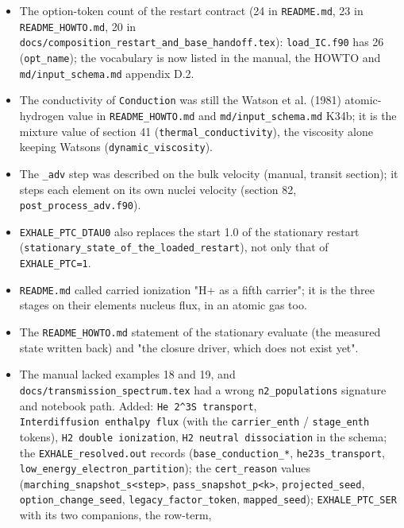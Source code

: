 \documentclass[english,a4paper]{my_memo}
\providecommand{\tightlist}{\setlength{\itemsep}{0pt}\setlength{\parskip}{0pt}}
\begin{document}
\begin{itemize}
\tightlist
\item
  The option-token count of the restart contract (24 in \texttt{README.md}, 23 in
  \texttt{README\_HOWTO.md}, 20 in \texttt{docs/composition\_restart\_and\_base\_handoff.tex}):
  \texttt{load\_IC.f90} has 26 (\texttt{opt\_name}); the vocabulary is now listed in the
  manual, the HOWTO and \texttt{md/input\_schema.md} appendix D.2.
\item
  The conductivity of \texttt{Conduction} was still the Watson et al. (1981)
  atomic-hydrogen value in \texttt{README\_HOWTO.md} and \texttt{md/input\_schema.md} K34b;
  it is the mixture value of section 41 (\texttt{thermal\_conductivity}), the
  viscosity alone keeping Watson\textquotesingle s (\texttt{dynamic\_viscosity}).
\item
  The \texttt{\_adv} step was described on the bulk velocity (manual, transit
  section); it steps each element on its own nuclei velocity (section 82,
  \texttt{post\_process\_adv.f90}).
\item
  \texttt{EXHALE\_PTC\_DTAU0} also replaces the start 1.0 of the stationary restart
  (\texttt{stationary\_state\_of\_the\_loaded\_restart}), not only that of
  \texttt{EXHALE\_PTC=1}.
\item
  \texttt{README.md} called carried ionization "H+ as a fifth carrier"; it is the
  three stages on their element\textquotesingle s nucleus flux, in an atomic gas too.
\item
  The \texttt{README\_HOWTO.md} statement of the stationary evaluate (the measured
  state written back) and "the closure driver, which does not exist yet".
\item
  The manual lacked examples 18 and 19, and \texttt{docs/transmission\_spectrum.tex}
  had a wrong \texttt{n2\_populations} signature and notebook path.
  Added: \texttt{He\ 2\^{}3S\ transport}, \texttt{Interdiffusion\ enthalpy\ flux} (with the
  \texttt{carrier\_enth} / \texttt{stage\_enth} tokens), \texttt{H2\ double\ ionization}, \texttt{H2\ neutral\ dissociation} in the schema; the \texttt{EXHALE\_resolved.out} records
  (\texttt{base\_conduction\_*}, \texttt{he23s\_transport}, \texttt{low\_energy\_electron\_partition});
  the \texttt{cert\_reason} values (\texttt{marching\_snapshot\_s\textless{}step\textgreater{}}, \texttt{pass\_snapshot\_p\textless{}k\textgreater{}},
  \texttt{projected\_seed}, \texttt{option\_change\_seed}, \texttt{legacy\_factor\_token},
  \texttt{mapped\_seed}); \texttt{EXHALE\_PTC\_SER} with its two companions, the row-term,

\end{itemize}
\end{document}
